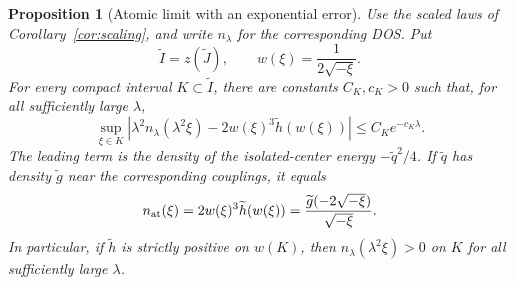 \documentclass[12pt,a4paper]{article}
\numberwithin{equation}{section}
\newtheorem{prop}[thm]{Proposition}
\begin{document}
\begin{prop}[Atomic limit with an exponential error]\label{prop:atomic}
Use the scaled laws of Corollary~\ref{cor:scaling}, and write $n_\lambda$ for
the corresponding DOS.  Put
$$
 \widetilde I=z(\widetilde J),\qquad
 w(\xi)=\frac{1}{2\sqrt{-\xi}}.
$$
For every compact interval $K\subset\widetilde I$, there are constants
$C_K,c_K>0$ such that, for all sufficiently large $\lambda$,
\begin{equation}
 \sup_{\xi\in K}
 \left|\lambda^2 n_\lambda(\lambda^2\xi)
       -2w(\xi)^3\widetilde h(w(\xi))\right|
 \le C_K e^{-c_K\lambda}.
\label{atomic-error}
\end{equation}
The leading term is the density of the isolated-center energy
$-\widetilde q^2/4$.  If $\widetilde q$ has density $\widetilde g$ near the
corresponding couplings, it equals
\begin{equation}
 n_{\rm at}(\xi)
 =2w(\xi)^3\widetilde h(w(\xi))
 =\frac{\widetilde g(-2\sqrt{-\xi})}{\sqrt{-\xi}}.
\label{atomic-density}
\end{equation}
In particular, if $\widetilde h$ is strictly positive on $w(K)$, then
$n_\lambda(\lambda^2\xi)>0$ on $K$ for all sufficiently large $\lambda$.
\end{prop}
\end{document}
